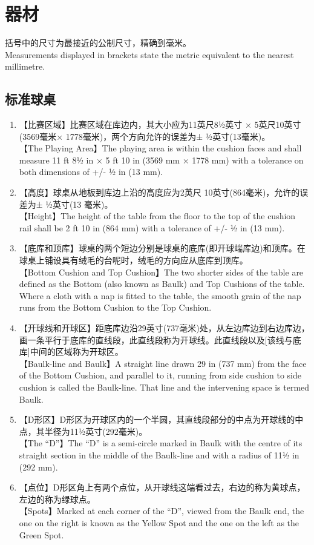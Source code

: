 \section{器材}\label{221}

\noindent 括号中的尺寸为最接近的公制尺寸，精确到毫米。\\
Measurements displayed in brackets state the metric equivalent to the nearest millimetre.

\subsection{标准球桌}\label{2211}

\begin{enumerate}[label=(\alph*)]
    \item 【比赛区域】比赛区域在库边内，其大小应为11英尺8½英寸 × 5英尺10英寸(3569毫米× 1778毫米)，两个方向允许的误差为± ½英寸(13毫米)。\\
    【The Playing Area】The playing area is within the cushion faces and shall measure 11 ft 8½ in × 5 ft 10 in (3569 mm × 1778 mm) with a tolerance on both dimensions of +/- ½ in (13 mm).
    \item 【高度】球桌从地板到库边上沿的高度应为2英尺 10英寸(864毫米)，允许的误差为± ½英寸(13 毫米)。\\
    【Height】The height of the table from the floor to the top of the cushion rail shall be 2 ft 10 in (864 mm) with a tolerance of +/- ½ in (13 mm).
    \item 【底库和顶库】球桌的两个短边分别是球桌的底库(即开球端库边)和顶库。在球桌上铺设具有绒毛的台呢时，绒毛的方向应从底库到顶库。\\
    【Bottom Cushion and Top Cushion】The two shorter sides of the table are defined as the Bottom (also known as Baulk) and Top Cushions of the table. Where a cloth with a nap is fitted to the table, the smooth grain of the nap runs from the Bottom Cushion to the Top Cushion.
    \item 【开球线和开球区】距底库边沿29英寸(737毫米)处，从左边库边到右边库边，画一条平行于底库的直线段，此直线段称为开球线。此直线段以及[该线与底库]中间的区域称为开球区。\\
    【Baulk-line and Baulk】A straight line drawn 29 in (737 mm) from the face of the Bottom Cushion, and parallel to it, running from side cushion to side cushion is called the Baulk-line. That line and the intervening space is termed Baulk.
    \item 【D形区】D形区为开球区内的一个半圆，其直线段部分的中点为开球线的中点，其半径为11½英寸(292毫米)。\\
    【The ``D''】The ``D'' is a semi-circle marked in Baulk with the centre of its straight section in the middle of the Baulk-line and with a 
    radius of 11½ in (292 mm).
    \item \label{2211f}【点位】D形区角上有两个点位，从开球线这端看过去，右边的称为黄球点，左边的称为绿球点。\\
    【Spots】Marked at each corner of the ``D'', viewed from the Baulk end, the one on the right is known as the Yellow Spot and the one on the left as the Green Spot.


\end{enumerate}
